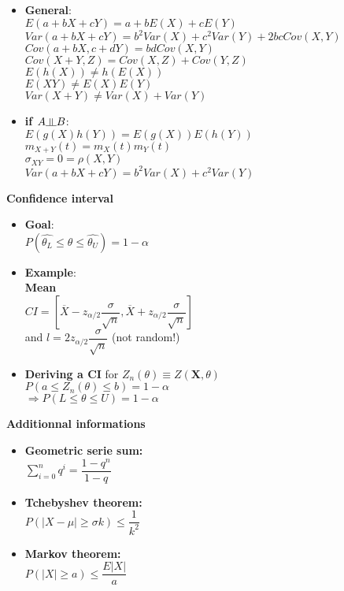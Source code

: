 \documentclass[a4paper, 10pt, landscape]{article}
\begin{document}
\begin{multicols*}{4}
\begin{itemize}
\item{\textbf{General}: \\ \textbullet $E(a+bX+cY)=a+bE(X)+cE(Y)$ \\ \textbullet $Var(a+bX+cY)=b^2Var(X)+c^2Var(Y)+2bcCov(X,Y)$ \\ \textbullet $Cov(a+bX,c+dY)=bdCov(X,Y)$ \\ \textbullet $Cov(X+Y,Z)=Cov(X,Z)+Cov(Y,Z)$ \\ \textbullet $E(h(X))\neq h(E(X))$ \\ \textbullet $E(XY)\neq E(X)E(Y)$ \\ \textbullet $Var(X+Y)\neq Var(X)+Var(Y)$}
\item{\textbf{if $A\indep B$}: \\ \textbullet $E(g(X)h(Y))=E(g(X))E(h(Y))$ \\ \textbullet $m_{X+Y}(t) = m_X(t)m_Y(t)$ \\ \textbullet $\sigma_{XY}=0=\rho(X,Y)$ \\ \textbullet $Var(a+bX+cY)=b^2Var(X)+c^2Var(Y)$}
\end{itemize}

\textbf{Confidence interval}
\begin{itemize}
\item{\textbf{Goal}: \\ \textbullet $P(\hat{\theta_L} \leq \theta \leq \hat{\theta_U})=1-\alpha$}
\item{\textbf{Example}: \\ \textbf{Mean} \\ \textbullet $CI=\left[ \overline{X}-z_{\alpha/2}\dfrac{\sigma}{\sqrt{n}}, \overline{X}+z_{\alpha/2}\dfrac{\sigma}{\sqrt{n}} \right]$ \\ and $l=2z_{\alpha/2}\dfrac{\sigma}{\sqrt{n}}$ (not random!)}
\item{\textbf{Deriving a CI} for $Z_n(\theta )\equiv Z(\textbf{X},\theta )$\\ \textbullet $P(a\leq Z_n(\theta ) \leq b)=1-\alpha$ \\ $\Rightarrow P(L\leq \theta \leq U)=1-\alpha$}
\end{itemize}

\textbf{Additionnal informations}

\begin{itemize}
\item{\textbf{Geometric serie sum:} \\ \textbullet $\displaystyle{\sum_{i=0}^n q^i} = \dfrac{1-q^n}{1-q}$}
\item{\textbf{Tchebyshev theorem:} \\ \textbullet $P( | X- \mu |\geq \sigma k) \leq \dfrac{1}{k^2}$}
\item{\textbf{Markov theorem:} \\ \textbullet $P(|X|\geq a)\leq \dfrac{E|X|}{a}$}
\end{itemize}
\end{multicols*}
\end{document}
